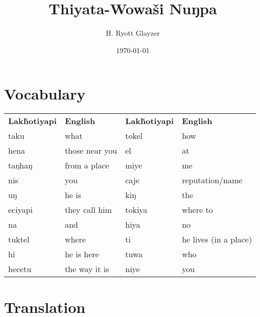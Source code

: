 \documentclass[11pt, letterpaper]{article}
\begin{document}


\title{Thiyata-Wowaši Nuŋpa}
\author{H. Ryott Glayzer}
\date{\today}


\maketitle

\section{Vocabulary}
\begin{table}[]
\begin{tabular}{llll}
\cline{1-2}
\textbf{Lakȟotiyapi} & \textbf{English} & \textbf{Lakȟotiyapi} & \textbf{English}      \\ \cline{1-2}
taku                 & what             & tokel                & how                   \\
hena                 & those near you   & el                   & at                    \\
taŋhaŋ               & from a place     & miye                 & me                    \\
nis                  & you              & caje                 & reputation/name       \\
uŋ                   & he is            & kiŋ                  & the                   \\
eciyapi              & they call him    & tokiya               & where to              \\
na                   & and              & hiya                 & no                    \\
tuktel               & where            & ti                   & he lives (in a place) \\
hi                   & he is here       & tuwa                 & who                   \\
hecetu               & the way it is    & niye                 & you                  
\end{tabular}
\end{table}

\section{Translation}
\end{document}
